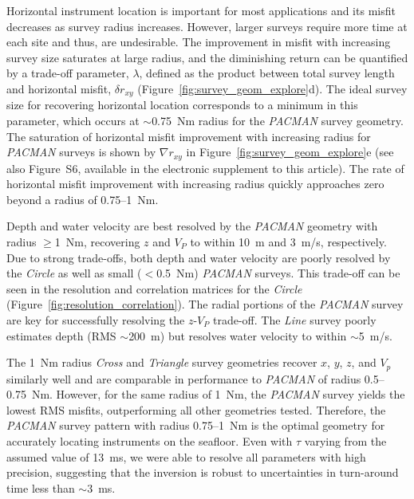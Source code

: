 Horizontal instrument location is important for most applications and its misfit decreases as survey radius increases. However, larger surveys require more time at each site and thus, are undesirable. The improvement in misfit with increasing survey size saturates at large radius, and the diminishing return can be quantified by a trade-off parameter, $\lambda$, defined as the product between total survey length and horizontal misfit, $\delta r_{xy}$ (Figure~\ref{fig:survey_geom_explore}d). The ideal survey size for recovering horizontal location corresponds to a minimum in this parameter, which occurs at $\sim$0.75~Nm radius for the \textit{PACMAN} survey geometry. The saturation of horizontal misfit improvement with increasing radius for \textit{PACMAN} surveys is shown by $\nabla r_{xy}$ in Figure~\ref{fig:survey_geom_explore}e (see also Figure~S6, available in the electronic supplement to this article). The rate of horizontal misfit improvement with increasing radius quickly approaches zero beyond a radius of 0.75--1~Nm.

Depth and water velocity are best resolved by the \textit{PACMAN} geometry with radius $\geq$1~Nm, recovering $z$ and $V_{P}$ to within 10~m and 3~m/s, respectively. Due to strong trade-offs, both depth and water velocity are poorly resolved by the \textit{Circle} as well as small ($<$0.5~Nm) \textit{PACMAN} surveys. This trade-off can be seen in the resolution and correlation matrices for the \textit{Circle} (Figure~\ref{fig:resolution_correlation}). The radial portions of the \textit{PACMAN} survey are key for successfully resolving the $z$-$V_P$ trade-off. The \textit{Line} survey poorly estimates depth (RMS $\sim$200~m) but resolves water velocity to within $\sim$5~m/s.

The 1~Nm radius \textit{Cross} and \textit{Triangle} survey geometries recover $x$, $y$, $z$, and $V_{p}$ similarly well and are comparable in performance to \textit{PACMAN} of radius 0.5--0.75~Nm. However, for the same radius of 1~Nm, the \textit{PACMAN} survey yields the lowest RMS misfits, outperforming all other geometries tested. Therefore, the \textit{PACMAN} survey pattern with radius 0.75--1~Nm is the optimal geometry for accurately locating instruments on the seafloor. Even with $\tau$ varying from the assumed value of 13~ms, we were able to resolve all parameters with high precision, suggesting that the inversion is robust to uncertainties in turn-around time less than $\sim$3~ms.

